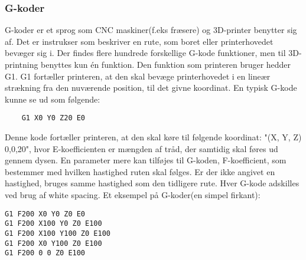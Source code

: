 
\subsubsection{G-koder} %
\label{ssub:g_koder}

G-koder er et sprog som CNC maskiner(f.eks fræsere) og 3D-printer benytter sig af. Det er instrukser som beskriver en rute, som boret eller printerhovedet bevæger sig i. \cite{gkode} 
Der findes flere hundrede forskellige G-kode funktioner, men til 3D-printning benyttes kun én funktion. Den funktion som printeren bruger hedder G1. G1 fortæller printeren, at den skal bevæge printerhovedet i en lineær strækning fra den nuværende position, til det givne koordinat.
En typisk G-kode kunne se ud som følgende: 

\begin{verbatim}
	G1 X0 Y0 Z20 E0
\end{verbatim}


Denne kode fortæller printeren, at den skal køre til følgende koordinat: "(X, Y, Z) 0,0,20", hvor E-koefficienten er mængden af tråd, der samtidig skal føres ud gennem dysen.
En parameter mere kan tilføjes til G-koden, F-koefficient, som bestemmer med hvilken hastighed ruten skal følges. Er der ikke angivet en hastighed, bruges samme hastighed som den tidligere rute. 
Hver G-kode adskilles ved brug af white spacing.
Et eksempel på G-koder(en simpel firkant):
\begin{lstlisting}
G1 F200 X0 Y0 Z0 E0
G1 F200 X100 Y0 Z0 E100
G1 F200 X100 Y100 Z0 E100
G1 F200 X0 Y100 Z0 E100
G1 F200 0 0 Z0 E100
\end{lstlisting}